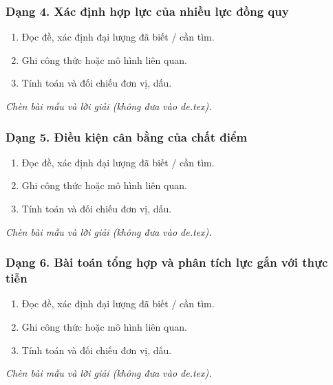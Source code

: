 \subsubsection{Dạng 4. Xác định hợp lực của nhiều lực đồng quy}
\begin{phuongphap}
\begin{enumerate}
\item Đọc đề, xác định đại lượng đã biết / cần tìm.
\item Ghi công thức hoặc mô hình liên quan.
\item Tính toán và đối chiếu đơn vị, dấu.
\end{enumerate}
\end{phuongphap}
\begin{vidumau}
\textit{Chèn bài mẫu và lời giải (không đưa vào de.tex).}
\end{vidumau}

\subsubsection{Dạng 5. Điều kiện cân bằng của chất điểm}
\begin{phuongphap}
\begin{enumerate}
\item Đọc đề, xác định đại lượng đã biết / cần tìm.
\item Ghi công thức hoặc mô hình liên quan.
\item Tính toán và đối chiếu đơn vị, dấu.
\end{enumerate}
\end{phuongphap}
\begin{vidumau}
\textit{Chèn bài mẫu và lời giải (không đưa vào de.tex).}
\end{vidumau}

\subsubsection{Dạng 6. Bài toán tổng hợp và phân tích lực gắn với thực tiễn}
\begin{phuongphap}
\begin{enumerate}
\item Đọc đề, xác định đại lượng đã biết / cần tìm.
\item Ghi công thức hoặc mô hình liên quan.
\item Tính toán và đối chiếu đơn vị, dấu.
\end{enumerate}
\end{phuongphap}
\begin{vidumau}
\textit{Chèn bài mẫu và lời giải (không đưa vào de.tex).}
\end{vidumau}

